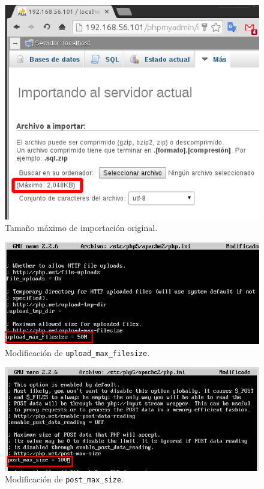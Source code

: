 \begin{figure}[H]
    \begin{center}
        \includegraphics[scale=0.5]{imagenes/img35}
        \caption{Tamaño máximo de importación original.}
        \label{fig32}
    \end{center}
\end{figure}

\begin{figure}[H]
    \begin{center}
        \includegraphics[scale=0.5]{imagenes/img36}
        \caption{Modificación de \texttt{upload\_max\_filesize}.}
        \label{fig33}
    \end{center}
\end{figure}

\begin{figure}[H]
    \begin{center}
        \includegraphics[scale=0.5]{imagenes/img37}
        \caption{Modificación de \texttt{post\_max\_size}.}
        \label{fig34}
    \end{center}
\end{figure}

